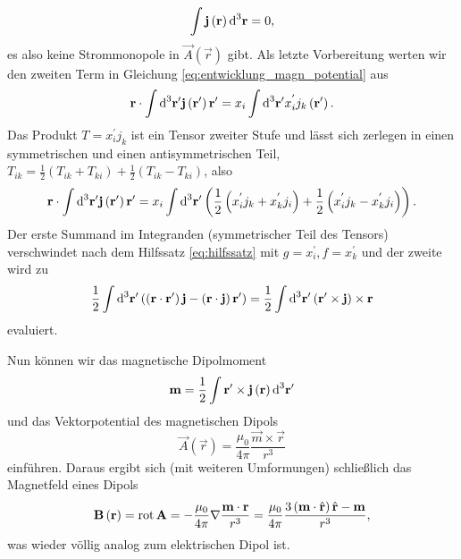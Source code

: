 \begin{equation*}
	\int \mathbf{j}\left(\mathbf{r}\right)\text{d} ^{3}\mathbf{r}=0,
\end{equation*}
es also keine Strommonopole in $\vec {A}\left(\vec {r}\right)$ gibt. Als letzte Vorbereitung werten wir den zweiten Term in Gleichung \eqref{eq:entwicklung_magn_potential} aus
\begin{equation*}
	\mathbf{r}\cdot \int \text{d} ^{3}\mathbf{r}'\mathbf{j}\left(\mathbf{r}'\right)\mathbf{r}'=x_{i}\int \text{d} ^{3}\mathbf{r}'x_{i}^{'}j_{k}\left(\mathbf{r}'\right).
\end{equation*}
Das Produkt $T=x_{i}^{'}j_{k}$ ist ein Tensor zweiter Stufe und lässt sich zerlegen in einen symmetrischen und einen antisymmetrischen Teil, $T_{ik}=\frac{1}{2}\left(T_{ik}+T_{ki}\right)+\frac{1}{2}\left(T_{ik}-T_{ki}\right)$, also
\begin{equation*}
	\mathbf{r}\cdot \int \text{d} ^{3}\mathbf{r}'\mathbf{j}\left(\mathbf{r}'\right)\mathbf{r}'=x_{i}\int \text{d} ^{3}\mathbf{r}'\left(\frac{1}{2}\left(x_{i}^{'}j_{k}+x_{k}^{'}j_{i}\right)+\frac{1}{2}\left(x_{i}^{'}j_{k}-x_{k}^{'}j_{i}\right)\right).
\end{equation*}
Der erste Summand im Integranden (symmetrischer Teil des Tensors) verschwindet nach dem Hilfssatz \eqref{eq:hilfssatz} mit $g=x_{i}^{'},f=x_{k}^{'}$ und der zweite wird zu
\begin{equation*}
	\frac{1}{2}\int \text{d} ^{3}\mathbf{r}'\left(\left(\mathbf{r}\cdot \mathbf{r}'\right)\mathbf{j}-\left(\mathbf{r}\cdot \mathbf{j}\right)\mathbf{r}'\right)=\frac{1}{2}\int \text{d} ^{3}\mathbf{r}'\left(\mathbf{r}'\times \mathbf{j}\right)\times \mathbf{r}
\end{equation*}
evaluiert.

Nun können wir das magnetische Dipolmoment
\begin{equation*}
	\mathbf{m}=\frac{1}{2}\int \mathbf{r}'\times \mathbf{j}\left(\mathbf{r}\right)\text{d} ^{3}\mathbf{r}'
\end{equation*}
und das Vektorpotential des magnetischen Dipols
\begin{equation*}
	\vec {A}\left(\vec {r}\right)=\frac{\mu _{0}}{4\pi }\frac{\vec {m}\times \vec {r}}{r^{3}}
\end{equation*}
einführen. Daraus ergibt sich (mit weiteren Umformungen) schließlich das Magnetfeld eines Dipols
\begin{equation*}
	\mathbf{B}\left(\mathbf{r}\right)=\operatorname{rot} \mathbf{A}=-\frac{\mu _{0}}{4\pi }\nabla \frac{\mathbf{m}\cdot \mathbf{r}}{r^{3}}=\frac{\mu _{0}}{4\pi }\frac{3\left(\mathbf{m}\cdot \hat{\mathbf{r}}\right)\hat{\mathbf{r}}-\mathbf{m}}{r^{3}},
\end{equation*}
was wieder völlig analog zum elektrischen Dipol ist.

